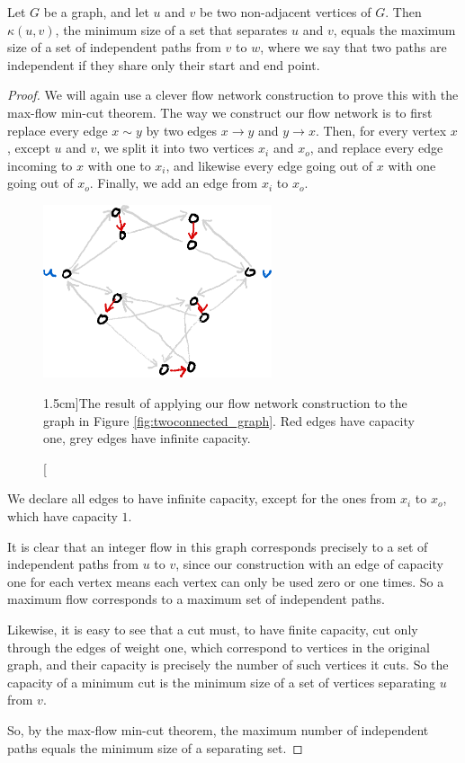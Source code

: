 \documentclass[nobib]{tufte-handout}
\begin{document}
\begin{theorem}[Menger]
  Let $G$ be a graph, and let $u$ and $v$ be two non-adjacent vertices of $G$. Then $\kappa(u,v)$, the minimum size of a set that separates $u$ and $v$, equals the maximum size of a set of independent paths from $v$ to $w$, where we say that two paths are independent if they share only their start and end point.

  \begin{proof}
    We will again use a clever flow network construction to prove this with the max-flow min-cut theorem. The way we construct our flow network is to first replace every edge $x\sim y$ by two edges $x\to y$ and $y\to x$. Then, for every vertex $x$, except $u$ and $v$, we split it into two vertices $x_i$ and $x_o$, and replace every edge incoming to $x$ with one to $x_i$, and likewise every edge going out of $x$ with one going out of $x_o$. Finally, we add an edge from $x_i$ to $x_o$.

    \begin{figure}
      \centering
      \includegraphics[width=0.6\textwidth]{graphics/L10_connectivity/menger_theorem_construction.png}
      \caption[][1.5cm]{The result of applying our flow network construction to the graph in Figure \ref{fig:twoconnected_graph}. Red edges have capacity one, grey edges have infinite capacity.}
      \label{fig:menger_thm_construction}
    \end{figure}

    We declare all edges to have infinite capacity, except for the ones from $x_i$ to $x_o$, which have capacity $1$.

    It is clear that an integer flow in this graph corresponds precisely to a set of independent paths from $u$ to $v$, since our construction with an edge of capacity one for each vertex means each vertex can only be used zero or one times. So a maximum flow corresponds to a maximum set of independent paths.

    Likewise, it is easy to see that a cut must, to have finite capacity, cut only through the edges of weight one, which correspond to vertices in the original graph, and their capacity is precisely the number of such vertices it cuts. So the capacity of a minimum cut is the minimum size of a set of vertices separating $u$ from $v$.

    So, by the max-flow min-cut theorem, the maximum number of independent paths equals the minimum size of a separating set.
  \end{proof}
\end{theorem}
\end{document}
